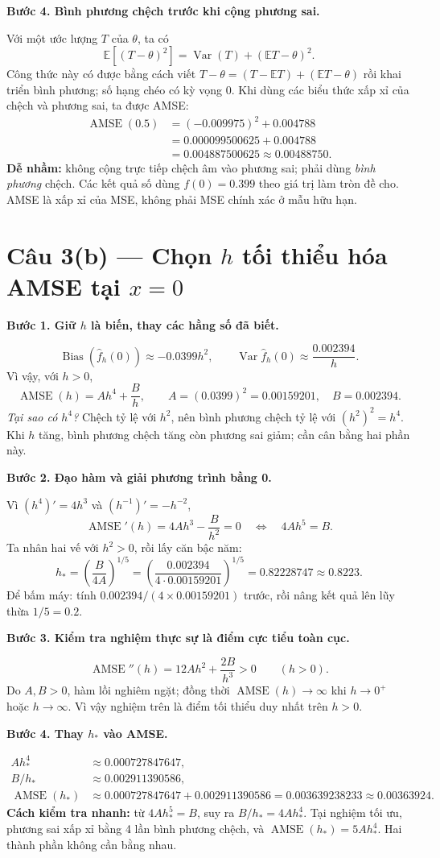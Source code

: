 \documentclass[11pt,a4paper]{article}
\newcommand{\E}{\mathbb E}
\newcommand{\fh}{\widehat f_h}
\DeclareMathOperator{\Var}{Var}
\DeclareMathOperator{\Bias}{Bias}
\DeclareMathOperator{\AMSE}{AMSE}
\newcommand{\buoc}[1]{\par\medskip\textbf{#1}\par}
\begin{document}
\buoc{Bước 4. Bình phương chệch trước khi cộng phương sai.}
Với một ước lượng $T$ của $\theta$, ta có
\[
\E[(T-\theta)^2]=\Var(T)+(\E T-\theta)^2.
\]
Công thức này có được bằng cách viết $T-\theta=(T-\E T)+(\E T-\theta)$ rồi khai triển bình phương; số hạng chéo có kỳ vọng 0. Khi dùng các biểu thức xấp xỉ của chệch và phương sai, ta được AMSE:
\begin{align*}
\AMSE(0.5)&=(-0.009975)^2+0.004788\\
&=0.000099500625+0.004788\\
&=\boxed{0.004887500625\approx0.00488750}.
\end{align*}
\textbf{Dễ nhầm:} không cộng trực tiếp chệch âm vào phương sai; phải dùng \emph{bình phương} chệch. Các kết quả số dùng $f(0)=0.399$ theo giá trị làm tròn đề cho. AMSE là xấp xỉ của MSE, không phải MSE chính xác ở mẫu hữu hạn.

\clearpage
\section*{Câu 3(b) — Chọn $h$ tối thiểu hóa AMSE tại $x=0$}
\buoc{Bước 1. Giữ $h$ là biến, thay các hằng số đã biết.}
\[
\Bias(\fh(0))\approx-0.0399h^2,\qquad
\Var\fh(0)\approx\frac{0.002394}{h}.
\]
Vì vậy, với $h>0$,
\[
\boxed{\AMSE(h)=Ah^4+\frac Bh,\qquad
A=(0.0399)^2=0.00159201,\quad B=0.002394.}
\]
\textit{Tại sao có $h^4$?} Chệch tỷ lệ với $h^2$, nên bình phương chệch tỷ lệ với $(h^2)^2=h^4$. Khi $h$ tăng, bình phương chệch tăng còn phương sai giảm; cần cân bằng hai phần này.

\buoc{Bước 2. Đạo hàm và giải phương trình bằng 0.}
Vì $(h^4)'=4h^3$ và $(h^{-1})'=-h^{-2}$,
\[
\AMSE'(h)=4Ah^3-\frac{B}{h^2}=0
\quad\Longleftrightarrow\quad4Ah^5=B.
\]
Ta nhân hai vế với $h^2>0$, rồi lấy căn bậc năm:
\[
h_* =\left(\frac{B}{4A}\right)^{1/5}
=\left(\frac{0.002394}{4\cdot0.00159201}\right)^{1/5}
=\boxed{0.82228747\approx0.8223}.
\]
Để bấm máy: tính $0.002394/(4\times0.00159201)$ trước, rồi nâng kết quả lên lũy thừa $1/5=0.2$.

\buoc{Bước 3. Kiểm tra nghiệm thực sự là điểm cực tiểu toàn cục.}
\[
\AMSE''(h)=12Ah^2+\frac{2B}{h^3}>0\qquad(h>0).
\]
Do $A,B>0$, hàm lồi nghiêm ngặt; đồng thời $\AMSE(h)\to\infty$ khi $h\to0^+$ hoặc $h\to\infty$. Vì vậy nghiệm trên là điểm tối thiểu duy nhất trên $h>0$.

\buoc{Bước 4. Thay $h_*$ vào AMSE.}
\begin{align*}
A h_*^4&\approx0.000727847647,\\
B/h_*&\approx0.002911390586,\\
\AMSE(h_*)&\approx0.000727847647+0.002911390586
=\boxed{0.003639238233\approx0.00363924}.
\end{align*}
\textbf{Cách kiểm tra nhanh:} từ $4Ah_*^5=B$, suy ra $B/h_*=4Ah_*^4$. Tại nghiệm tối ưu, phương sai xấp xỉ bằng 4 lần bình phương chệch, và $\AMSE(h_*)=5Ah_*^4$. Hai thành phần không cần bằng nhau.
\end{document}
